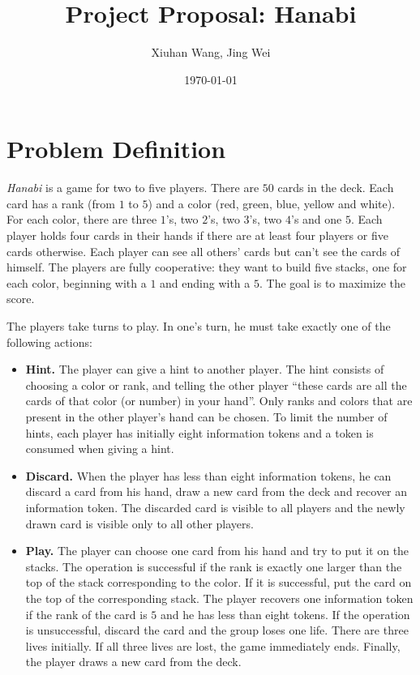 \documentclass[12pt]{article}
\begin{document}
\title{\textbf{Project Proposal: Hanabi}}
\author{Xiuhan Wang, Jing Wei}
\date{\today}
\maketitle

\section{Problem Definition}
\textsl{Hanabi} is a game for two to five players. There are $50$ cards in the deck. Each card has a rank (from $1$ to $5$) and a color (red, green, blue, yellow and white). For each color, there are three $1$'s, two $2$'s, two $3$'s, two $4$'s and one $5$. Each player holds four cards in their hands if there are at least four players or five cards otherwise. Each player can see all others' cards but can't see the cards of himself. The players are fully cooperative: they want to build five stacks, one for each color, beginning with a $1$ and ending with a $5$. The goal is to maximize the score.

The players take turns to play. In one's turn, he must take exactly one of the following actions:

\begin{itemize}
\vspace{-1ex}
\item \textbf{Hint.} The player can give a hint to another player. The hint consists of choosing a color or rank, and telling the other player ``these cards are all the cards of that color (or number) in your hand''. Only ranks and colors that are present in the other player's hand can be chosen. To limit the number of hints, each player has initially eight information tokens and a token is consumed when giving a hint.
\vspace{-1ex}
\item \textbf{Discard.} When the player has less than eight information tokens, he can discard a card from his hand, draw a new card from the deck and recover an information token. The discarded card is visible to all players and the newly drawn card is visible only to all other players.
\vspace{-1ex}
\item \textbf{Play.} The player can choose one card from his hand and try to put it on the stacks. The operation is successful if the rank is exactly one larger than the top of the stack corresponding to the color. If it is successful, put the card on the top of the corresponding stack. The player recovers one information token if the rank of the card is $5$ and he has less than eight tokens. If the operation is unsuccessful, discard the card and the group loses one life. There are three lives initially. If all three lives are lost, the game immediately ends. Finally, the player draws a new card from the deck.
\end{itemize}
\end{document}
